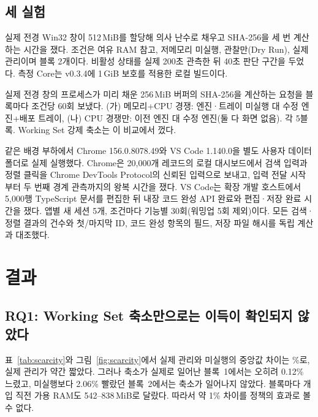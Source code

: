 \documentclass[11pt]{article}
\begin{document}
\subsection{세 실험}
\begin{description}[leftmargin=1.2em,style=nextline,itemsep=3pt]
  \item[E1. 저메모리 완료 시간 (배경 제어 개편 전)] 실제 전경 Win32 창이 512\,MiB를 할당해 의사 난수로 채우고 SHA-256을 세 번 계산하는 시간을 쟀다. 조건은 여유 RAM 참고, 저메모리 미실행, 관찰만(Dry Run), 실제 관리이며 블록 2개이다. 비활성 상태를 실제 200초 관측한 뒤 40초 판단 구간을 두었다. 측정 Core는 v0.3.4에 1\,GiB 보호를 적용한 로컬 빌드이다.
  \item[E2. 명시적 배경 제어] 실제 전경 창의 프로세스가 미리 채운 256\,MiB 버퍼의 SHA-256을 계산하는 요청을 블록마다 조건당 60회 보냈다. (가) 메모리+CPU 경쟁: 엔진·트레이 미실행 대 수정 엔진+배포 트레이, (나) CPU 경쟁만: 이전 엔진 대 수정 엔진(둘 다 화면 없음). 각 5블록. Working Set 강제 축소는 이 비교에서 껐다.
  \item[E3. 실제 앱] 같은 배경 부하에서 Chrome 156.0.8078.49와 VS Code 1.140.0을 별도 사용자 데이터 폴더로 실제 실행했다. Chrome은 20,000개 레코드의 로컬 대시보드에서 검색 입력과 정렬 클릭을 Chrome DevTools Protocol의 신뢰된 입력으로 보내고, 입력 전달 시작부터 두 번째  경계 관측까지의 왕복 시간을 쟀다\citep{cdp}. VS Code는 확장 개발 호스트에서 5,000행 TypeScript 문서를 편집한 뒤 내장 코드 완성 API 완료와 편집·저장 완료 시간을 쟀다\citep{vscodetest}. 앱별 새 세션 5개, 조건마다 기능별 30회(워밍업 5회 제외)이다. 모든 검색·정렬 결과의 건수와 첫/마지막 ID, 코드 완성 항목의 필드, 저장 파일 해시를 독립 계산과 대조했다.
\end{description}

\section{결과}
\label{sec:results}

\subsection{RQ1: Working Set 축소만으로는 이득이 확인되지 않았다}
\label{sec:rq1}


표~\ref{tab:scarcity}와 그림~\ref{fig:scarcity}에서 실제 관리와 미실행의 중앙값 차이는 \numScDiffPct\%로, 실제 관리가 약간 짧았다. 그러나 축소가 실제로 일어난 블록~1에서는 오히려 0.12\% 느렸고, 미실행보다 2.06\% 빨랐던 블록~2에서는 축소가 일어나지 않았다. 블록마다 개입 직전 가용 RAM도 542--838\,MiB로 달랐다. 따라서 약 1\% 차이를 정책의 효과로 볼 수 없다.
\end{document}
